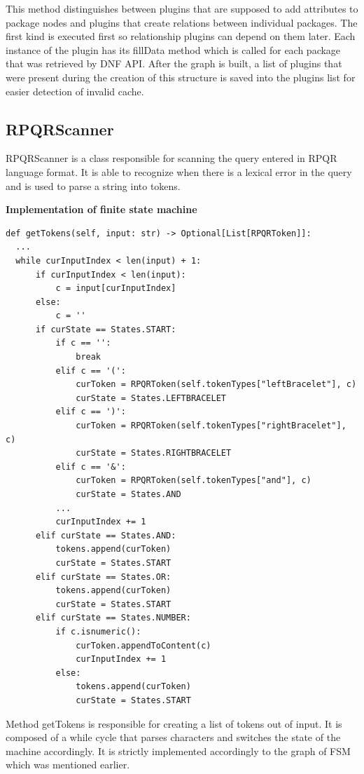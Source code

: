 This method distinguishes between plugins that are supposed to add attributes to package nodes and
plugins that create relations between individual packages. The first kind is executed first so
relationship plugins can depend on them later. Each instance of the plugin has its fillData method
which is called for each package that was retrieved by DNF API. After the graph is built, a list
of plugins that were present during the creation of this structure is saved into the plugins list for easier
detection of invalid cache.

\subsection*{RPQRScanner}
RPQRScanner is a class responsible for scanning the query entered in RPQR language format. It is able
to recognize when there is a lexical error in the query and is used to parse a string into tokens.

\textbf{Implementation of finite state machine}

\begin{lstlisting}
def getTokens(self, input: str) -> Optional[List[RPQRToken]]:
  ...
  while curInputIndex < len(input) + 1:
      if curInputIndex < len(input):
          c = input[curInputIndex]
      else:
          c = ''
      if curState == States.START:
          if c == '':
              break
          elif c == '(':
              curToken = RPQRToken(self.tokenTypes["leftBracelet"], c)
              curState = States.LEFTBRACELET
          elif c == ')':
              curToken = RPQRToken(self.tokenTypes["rightBracelet"], c)
              curState = States.RIGHTBRACELET
          elif c == '&':
              curToken = RPQRToken(self.tokenTypes["and"], c)
              curState = States.AND
          ...
          curInputIndex += 1
      elif curState == States.AND:
          tokens.append(curToken)
          curState = States.START
      elif curState == States.OR:
          tokens.append(curToken)
          curState = States.START
      elif curState == States.NUMBER:
          if c.isnumeric():
              curToken.appendToContent(c)
              curInputIndex += 1
          else:
              tokens.append(curToken)
              curState = States.START
\end{lstlisting}

Method getTokens is responsible for creating a list of tokens out of input. It is composed of
a while cycle that parses characters and switches the state of the machine accordingly. It is strictly
implemented accordingly to the graph of FSM which was mentioned earlier.

